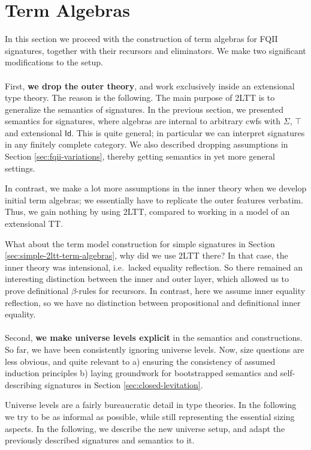 \documentclass[12pt,a4paper,twoside,openany]{book}
\theoremstyle{remark}
\theoremstyle{definition}
\theoremstyle{theorem}
\newcommand{\Id}{\mathsf{Id}}
\begin{document}
\section{Term Algebras}
\label{sec:fqiit-term-algebras}

In this section we proceed with the construction of term algebras for FQII
signatures, together with their recursors and eliminators. We make two
significant modifications to the setup.
\\\\
\indent First, \textbf{we drop the outer theory}, and work exclusively inside an
extensional type theory. The reason is the following. The main purpose of 2LTT
is to generalize the semantics of signatures. In the previous section, we
presented semantics for signatures, where algebras are internal to arbitrary
cwfs with $\Sigma$, $\top$ and extensional $\Id$. This is quite general; in
particular we can interpret signatures in any finitely complete category. We
also described dropping assumptions in Section \ref{sec:fqii-variations},
thereby getting semantics in yet more general settings.

In contrast, we make a lot more assumptions in the inner theory when we develop
initial term algebras; we essentially have to replicate the outer features
verbatim.  Thus, we gain nothing by using 2LTT, compared to working in a model
of an extensional TT.

What about the term model construction for simple signatures in Section
\ref{sec:simple-2ltt-term-algebras}, why did we use 2LTT there? In that case,
the inner theory was intensional, i.e.\ lacked equality reflection. So
there remained an interesting distinction between the inner and outer layer,
which allowed us to prove definitional $\beta$-rules for recursors. In
contrast, here we assume inner equality reflection, so we have no distinction
between propositional and definitional inner equality.
\\\\
\indent Second, \textbf{we make universe levels explicit} in the semantics and
constructions. So far, we have been consistently ignoring universe levels. Now,
size questions are less obvious, and quite relevant to a) ensuring the
consistency of assumed induction principles b) laying groundwork for
bootstrapped semantics and self-describing signatures in Section \ref{sec:closed-levitation}.

Universe levels are a fairly bureaucratic detail in type theories. In the
following we try to be as informal as possible, while still representing the
essential sizing aspects. In the following, we describe the new universe setup,
and adapt the previously described signatures and semantics to it.
\end{document}
